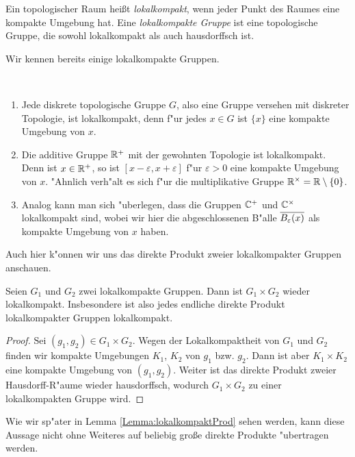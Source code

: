	
	\begin{defi}
		Ein topologischer Raum heißt \emph{lokalkompakt}, wenn jeder Punkt des Raumes eine kompakte Umgebung hat. 
		Eine \emph{lokalkompakte Gruppe} ist eine topologische Gruppe, die sowohl lokalkompakt als auch hausdorffsch ist. 
	\end{defi}
	Wir kennen bereits einige lokalkompakte Gruppen.
	\begin{bsp}~ 
		\begin{enumerate}[label=(\roman*)]
			\item Jede diskrete topologische Gruppe $G$, also eine Gruppe versehen mit diskreter Topologie, ist lokalkompakt, denn f"ur jedes $x \in G$ ist $\{x\}$ eine kompakte Umgebung von $x$.
			\item Die additive Gruppe $\mathbb{R}^+$ mit der gewohnten Topologie ist lokalkompakt. Denn ist $x\in\mathbb{R}^+$, so ist $[x-\varepsilon, x+\varepsilon]$ f"ur $\varepsilon>0$ eine kompakte Umgebung von $x$. "Ahnlich verh"alt es sich f"ur die multiplikative Gruppe $\mathbb{R}^\times = \mathbb{R} \setminus\{0\}$.
			\item Analog kann man sich "uberlegen, dass die Gruppen $\mathbb{C}^+$ und $\mathbb{C}^\times$ lokalkompakt sind, wobei wir hier die abgeschlossenen B"alle $\overline{B_\varepsilon(x)}$ als kompakte Umgebung von $x$ haben.
		\end{enumerate}
	\end{bsp}
	Auch hier k"onnen wir uns das direkte Produkt zweier lokalkompakter Gruppen anschauen. 
	\begin{lemma}\label{satz:topo:lcaproduct}
		Seien $G_1$ und $G_2$ zwei lokalkompakte Gruppen. 
		Dann ist $G_1\times G_2$ wieder lokalkompakt. 
		Insbesondere ist also jedes endliche direkte Produkt lokalkompakter Gruppen lokalkompakt.
	\end{lemma}
	\begin{proof}
		Sei $(g_1,g_2) \in G_1\times G_2$. Wegen der Lokalkompaktheit von $G_1$ und $G_2$ finden wir kompakte Umgebungen $K_1$, $K_2$ von $g_1$ bzw. $g_2$. Dann ist aber $K_1 \times K_2$ eine kompakte Umgebung von $(g_1,g_2)$. 
		Weiter ist das direkte Produkt zweier Hausdorff-R"aume wieder hausdorffsch, wodurch $G_1\times G_2$ zu einer lokalkompakten Gruppe wird.
	\end{proof}
	Wie wir sp"ater in Lemma \ref{Lemma:lokalkompaktProd} sehen werden, kann diese Aussage nicht ohne Weiteres auf beliebig gro\ss e direkte Produkte "ubertragen werden.

